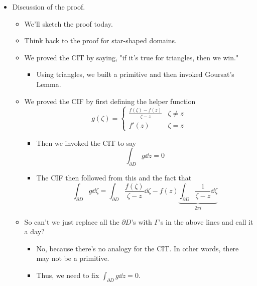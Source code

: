 \documentclass[../notes.tex]{subfiles}
\begin{document}
\begin{itemize}
\begin{enumerate}
\begin{equation*}
        \end{equation*}
    \end{enumerate}
    \pagebreak
    \item Discussion of the proof.
    \begin{itemize}
        \item We'll sketch the proof today.
        \item Think back to the proof for star-shaped domains.
        \item We proved the CIT by saying, "if it's true for triangles, then we win."
        \begin{itemize}
            \item Using triangles, we built a primitive and then invoked Goursat's Lemma.
        \end{itemize}
        \item We proved the CIF by first defining the helper function
        \begin{equation*}
            g(\zeta) =
            \begin{cases}
                \frac{f(\zeta)-f(z)}{\zeta-z} & \zeta\neq z\\
                f'(z) & \zeta=z
            \end{cases}
        \end{equation*}
        \begin{itemize}
            \item Then we invoked the CIT to say
            \begin{equation*}
                \int_{\partial D}g\dd{z} = 0
            \end{equation*}
            \item The CIF then followed from this and the fact that
            \begin{equation*}
                \int_{\partial D}g\dd\zeta = \int_{\partial D}\frac{f(\zeta)}{\zeta-z}\dd\zeta-f(z)\underbrace{\int_{\partial D}\frac{1}{\zeta-z}\dd\zeta}_{2\pi i}
            \end{equation*}
        \end{itemize}
        \item So can't we just replace all the $\partial D$'s with $\Gamma$'s in the above lines and call it a day?
        \begin{itemize}
            \item No, because there's no analogy for the CIT. In other words, there may not be a primitive.
            \item Thus, we need to fix $\int_{\partial D}g\dd{z}=0$.

\end{itemize}
\end{itemize}
\end{itemize}
\end{document}
